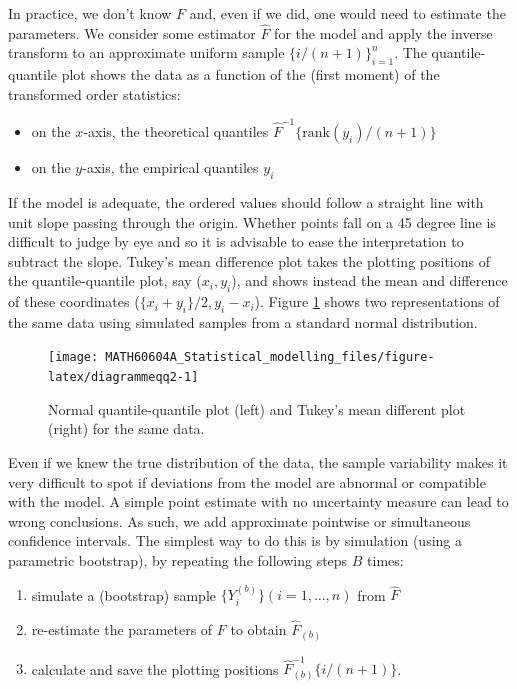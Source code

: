 \documentclass[
  11pt,
  letterpaper,
]{book}
\providecommand{\tightlist}{%
  \setlength{\itemsep}{0pt}\setlength{\parskip}{0pt}}
\theoremstyle{definition}
\theoremstyle{definition}
\theoremstyle{definition}
\theoremstyle{definition}
\theoremstyle{remark}
\begin{document}
In practice, we don't know \(F\) and, even if we did, one would need to estimate the parameters. We consider some estimator \(\widehat{F}\) for the model and apply the inverse transform to an approximate uniform sample \(\{i/(n+1)\}_{i=1}^n\). The quantile-quantile plot shows the data as a function of the (first moment) of the transformed order statistics:

\begin{itemize}
\tightlist
\item
  on the \(x\)-axis, the theoretical quantiles \(\widehat{F}^{-1}\{\mathrm{rank}(y_i)/(n+1)\}\)
\item
  on the \(y\)-axis, the empirical quantiles \(y_i\)
\end{itemize}

If the model is adequate, the ordered values should follow a straight line with unit slope passing through the origin. Whether points fall on a 45 degree line is difficult to judge by eye and so it is advisable to ease the interpretation to subtract the slope. Tukey's mean difference plot takes the plotting positions of the quantile-quantile plot, say (\(x_i, y_i\)), and shows instead the mean and difference of these coordinates (\(\{x_i + y_i\}/2, y_i - x_i\)). Figure \ref{fig:diagrammeqq2} shows two representations of the same data using simulated samples from a standard normal distribution.

\begin{figure}

{\centering \texttt{[image: MATH60604A\_Statistical\_modelling\_files/figure-latex/diagrammeqq2-1]} 

}

\caption{Normal quantile-quantile plot (left) and Tukey's mean different plot (right) for the same data.}\label{fig:diagrammeqq2}
\end{figure}

Even if we knew the true distribution of the data, the sample variability makes it very difficult to spot if deviations from the model are abnormal or compatible with the model. A simple point estimate with no uncertainty measure can lead to wrong conclusions. As such, we add approximate pointwise or simultaneous confidence intervals. The simplest way to do this is by simulation (using a parametric bootstrap), by repeating the following steps \(B\) times:

\begin{enumerate}
\def\labelenumi{\arabic{enumi}.}
\tightlist
\item
  simulate a (bootstrap) sample \(\{Y^{(b)}_{i}\} (i=1,\ldots, n)\) from \(\widehat{F}\)
\item
  re-estimate the parameters of \(F\) to obtain \(\widehat{F}_{(b)}\)
\item
  calculate and save the plotting positions \(\widehat{F}^{-1}_{(b)}\{i/(n+1)\}\).
\end{enumerate}
\end{document}
